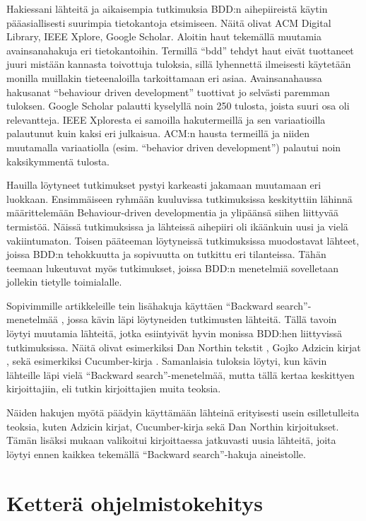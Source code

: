 \documentclass[finnish,nonumbib,nocopyright]{gradu2}
\begin{document}
Hakiessani lähteitä ja aikaisempia tutkimuksia BDD:n aihepiireistä käytin pääasiallisesti suurimpia tietokantoja etsimiseen. Näitä olivat ACM Digital Library, IEEE Xplore, Google Scholar. Aloitin haut tekemällä muutamia avainsanahakuja \cite{tutkimuspaska} eri tietokantoihin. Termillä ``bdd'' tehdyt haut eivät tuottaneet juuri mistään kannasta toivottuja tuloksia, sillä lyhennettä ilmeisesti käytetään monilla muillakin tieteenaloilla tarkoittamaan eri asiaa. Avainsanahaussa hakusanat ``behaviour driven development'' tuottivat jo selvästi paremman tuloksen. Google Scholar palautti kyselyllä noin 250 tulosta, joista suuri osa oli relevantteja. IEEE Xploresta ei samoilla hakutermeillä ja sen variaatioilla palautunut kuin kaksi eri julkaisua. ACM:n hausta termeillä ja niiden muutamalla variaatiolla (esim. ``behavior driven development'') palautui noin kaksikymmentä tulosta.

Hauilla löytyneet tutkimukset pystyi karkeasti jakamaan muutamaan eri luokkaan. Ensimmäiseen ryhmään kuuluvissa tutkimuksissa keskityttiin lähinnä määrittelemään Behaviour-driven developmentia ja ylipäänsä siihen liittyvää termistöä. Näissä tutkimuksissa ja lähteissä aihepiiri oli ikäänkuin uusi ja vielä vakiintumaton. Toisen pääteeman löytyneissä tutkimuksissa muodostavat lähteet, joissa BDD:n tehokkuutta ja sopivuutta on tutkittu eri tilanteissa. Tähän teemaan lukeutuvat myös tutkimukset, joissa BDD:n menetelmiä sovelletaan jollekin tietylle toimialalle.

Sopivimmille artikkeleille tein lisähakuja käyttäen ``Backward search''-menetelmää \cite{tutkimuspaska}, jossa kävin läpi löytyneiden tutkimusten lähteitä. Tällä tavoin löytyi muutamia lähteitä, jotka esiintyivät hyvin monissa BDD:hen liittyvissä tutkimuksissa. Näitä olivat esimerkiksi Dan Northin tekstit \cite{bddintro}, Gojko Adzicin kirjat \cite{bridging},\cite{specification} sekä esimerkiksi Cucumber-kirja \cite{cucumber}. Samanlaisia tuloksia löytyi, kun kävin lähteille läpi vielä ``Backward search''-menetelmää, mutta tällä kertaa keskittyen kirjoittajiin, eli tutkin kirjoittajien muita teoksia.

Näiden hakujen myötä päädyin käyttämään lähteinä erityisesti usein esilletulleita teoksia, kuten Adzicin kirjat, Cucumber-kirja sekä Dan Northin kirjoitukset. Tämän lisäksi mukaan valikoitui kirjoittaessa jatkuvasti uusia lähteitä, joita löytyi ennen kaikkea tekemällä ``Backward search''-hakuja aineistolle.

\chapter{Ketterä ohjelmistokehitys}
\end{document}
